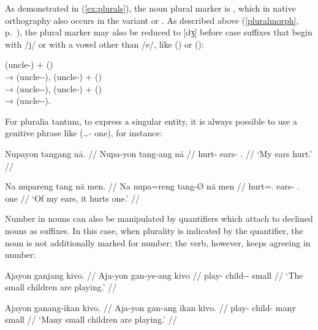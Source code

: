 As demonstrated in (\ref{ex:plurals}), the noun plural marker is 
, which in native orthography also occurs in the variant 
 or . As described above (\autoref{pluralmorph}, 
p.~\pageref{pluralmorph}), the plural marker may also be reduced to [dʒ] 
 before case suffixes that begin with /j/ or with a vowel other than 
/e/, like  (\Aarg{}) or  (\Dat{}):

\pex
	\a {} (uncle-\Aarg{})
		+  (\Pl{}) \\[0.5\baselineskip]
		→  (uncle-\Pl{}-\Aarg{}),
	\a {} (uncle-\Gen{})
		+  (\Pl{}) \\[0.5\baselineskip]
		→  (uncle-\Pl{}-\Gen{}),
	\a {} (uncle-\Dat{})
		+  (\Pl{}) \\[0.5\baselineskip]
		→  (uncle-\Pl{}-\Dat{}).
\xe

For pluralia tantum, to express a singular entity, it is always possible to 
use a genitive phrase like  (…-\Gen{} 
one), for instance:

\pex
\a\begingl
	\gla Nupayon tangang nā. //
	\glb Nupa-yon tang-ang nā //
	\glc hurt-\TplN{} ears-\Aarg{} \Fsg{}.\Gen{} //
	\glft `My ears hurt.' //
\endgl

\a\label{ex:gensubj}\begingl
	\gla Na nupareng tang nā men. //
	\glb Na nupa=reng tang-Ø nā men //
	\glc \GenT{} hurt=\TsgI{}.\Aarg{} ears-\Top{} \Fsg{}.\Gen{} one //
	\glft `Of my ears, it hurts one.' //
\endgl
\xe

Number in nouns can also be manipulated by quantifiers which attach to declined
nouns as suffixes. In this case, when plurality is indicated by the quantifier,
the noun is not additionally marked for number; the verb, however, keeps
agreeing in number:

\pex
\a\begingl
	\gla Ajayon ganjang kivo. //
	\glb Aja-yon gan-ye-ang kivo //
	\glc play-\TsgN{} child-\Pl{}-\Aarg{} small //
	\glft `The small children are playing.' //
\endgl
	
\a\label{ex:nounquant}\begingl
	\gla Ajayon ganang-ikan kivo. //
	\glb Aja-yon {gan-ang ikan} kivo. //
	\glc play-\TsgN{} {child-\Aarg{} many} small //
	\glft `Many small children are playing.' //
\endgl

